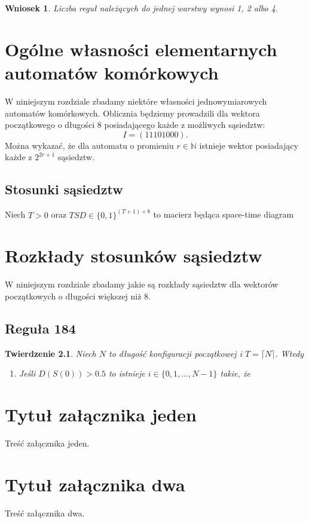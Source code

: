 \documentclass{xmgr}
\newtheorem{theorem}{Twierdzenie}
\newtheorem{corollary}{Wniosek}
\begin{document}
\begin{corollary}
 Liczba reguł należących do jednej warstwy wynosi 1, 2 albo 4.
\end{corollary}

\chapter{Ogólne własności elementarnych automatów komórkowych}
W niniejszym rozdziale zbadamy niektóre własności jednowymiarowych automatów komórkowych. Oblicznia będziemy prowadzili dla wektora 
początkowego o długości 8 posiadającego każde z możliwych sąsiedztw:
\[
 I = (11101000).
\]
Można wykazać, że dla automatu o promieniu $r\in\mathbb{N}$ istnieje wektor posiadający każde z $2^{2r+1}$ sąsiedztw.
\section{Stosunki sąsiedztw}
Niech $T > 0$ oraz $TSD \in \{0,1\}^{(T+1)\times8}$ to macierz będąca space-time diagram 

\chapter{Rozkłady stosunków sąsiedztw}
W niniejszym rozdziale zbadamy jakie są rozkłady sąsiedztw dla wektorów początkowych o długości większej niż 8.

\section{Reguła 184}

\begin{theorem}
 Niech $N$ to długość konfiguracji początkowej i $T = \lceil N \rceil $. Wtedy 
 \begin{enumerate}
  \item Jeśli $D(S(0)) > 0.5$ to istnieje $i \in \{0, 1, ..., N - 1 \}$ takie, że
 \end{enumerate}

\end{theorem}

\summary

\appendix
\chapter{Tytuł załącznika jeden}

Treść załącznika jeden.

\chapter{Tytuł załącznika dwa}

Treść załącznika dwa.




\listoftables

\listoffigures

\oswiadczenie
\end{document}
